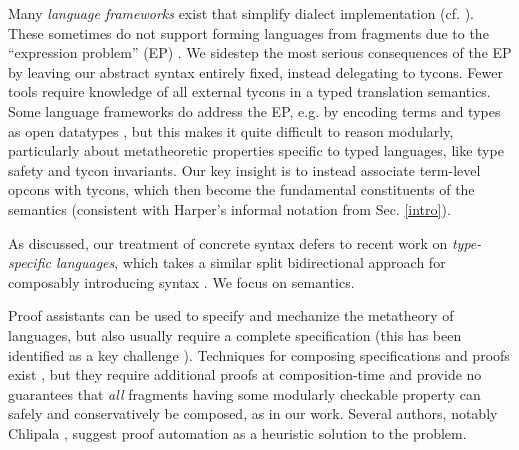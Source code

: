 \documentclass[pldi]{sigplanconf-pldi15}
\begin{document}
Many \emph{language frameworks} exist that simplify  dialect implementation (cf. \cite{erdweg2013state}). %
These sometimes do not support forming  languages from fragments due to the ``expression problem'' (EP) \cite{wadler1998expression,Reynolds75}. We sidestep the most serious consequences of the EP by leaving our abstract syntax entirely fixed, instead  delegating to tycons. Fewer tools require knowledge of all external tycons in a typed translation semantics. Some language frameworks do address the EP, e.g. by encoding terms and types as open datatypes \cite{conf/ppdp/LohH06}, but this makes it quite difficult to reason modularly, particularly about metatheoretic properties specific to typed languages, like type safety and tycon invariants. Our key insight is to instead associate term-level opcons with tycons, which then become the fundamental constituents of the semantics (consistent with Harper's informal notation from Sec. \ref{intro}).

As discussed, our treatment of concrete syntax defers to recent work on \emph{type-specific languages}, which takes a similar split bidirectional approach for composably introducing syntax \cite{TSLs}. We focus on  semantics.

Proof assistants can be used to specify and mechanize the metatheory of languages, but also usually require a complete specification (this  has been identified as a key challenge \cite{aydemir05tphols}). Techniques for composing specifications and proofs exist \cite{conf/popl/DelawareOS13,Delaware11,conf/plpv/SchwaabS13}, but they  require additional proofs at composition-time and provide no guarantees that \emph{all} fragments having some modularly checkable property can safely and  conservatively be composed, as in our work. %
Several authors, notably Chlipala  \cite{Chlipala10}, suggest  proof automation as a heuristic solution to the problem. 
\end{document}
